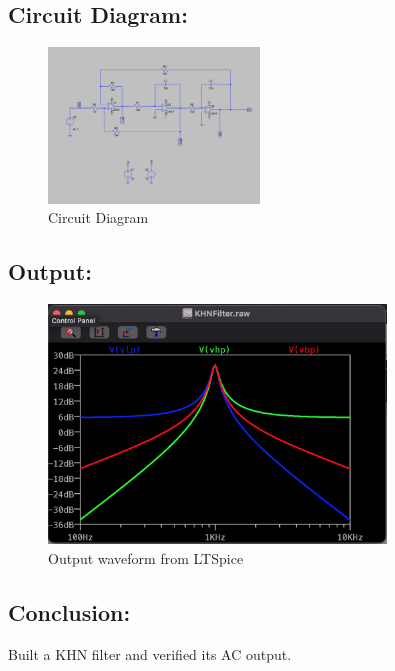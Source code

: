 \documentclass[a4paper,12pt]{report}
\begin{document}
  \vspace{0.3cm}

  \subsection{Circuit Diagram:} 
    \begin{figure}[htbp]
    \centering
      \includegraphics[width=0.5\textwidth]{../Img/E4Ckt}
    \caption{Circuit Diagram}
    \label{fig:image}
    \end{figure}

    \vspace*{\fill} %
    \newpage

  \subsection{Output:} 
    \begin{figure}[h!]
        \centering
        \includegraphics[width=0.8\textwidth]{../Img/E4Op}
        \caption{Output waveform from LTSpice}
    \end{figure}

  \vspace{0.3cm}

  \subsection{Conclusion:} 
    \hspace{20pt}Built a KHN filter and verified its AC output.
\end{document}

